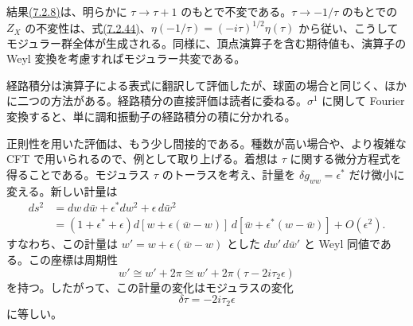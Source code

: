 結果\hyperref[eq:7.2.8]{(7.2.8)}は、明らかに $\tau\to\tau+1$ のもとで不変である。$\tau\to-1/\tau$ のもとでの $Z_X$ の不変性は、式\hyperref[eq:7.2.44b]{(7.2.44)}、$\eta(-1/\tau)=(-i\tau)^{1/2}\eta(\tau)$ から従い、こうしてモジュラー群全体が生成される。同様に、頂点演算子を含む期待値も、演算子の Weyl 変換を考慮すればモジュラー共変である。

経路積分は演算子による表式に翻訳して評価したが、球面の場合と同じく、ほかに二つの方法がある。経路積分の直接評価は読者に委ねる。$\sigma^1$ に関して Fourier 変換すると、単に調和振動子の経路積分の積に分かれる。

正則性を用いた評価は、もう少し間接的である。種数が高い場合や、より複雑な CFT で用いられるので、例として取り上げる。着想は $\tau$ に関する微分方程式を得ることである。モジュラス $\tau$ のトーラスを考え、計量を $\delta g_{ww}=\epsilon^*$ だけ微小に変える。新しい計量は
\begin{equation}
\begin{aligned}
ds^2&=dw\,d\bar w+\epsilon^*dw^2+\epsilon\,d\bar w^2\\
&=(1+\epsilon^*+\epsilon)
d[w+\epsilon(\bar w-w)]\,d[\bar w+\epsilon^*(w-\bar w)]
+O(\epsilon^2).
\end{aligned}
\tag{7.2.11}\label{eq:7.2.11}
\end{equation}
すなわち、この計量は $w'=w+\epsilon(\bar w-w)$ とした $dw'\,d\bar w'$ と Weyl 同値である。この座標は周期性
\begin{equation}
w'\cong w'+2\pi\cong w'+2\pi(\tau-2i\tau_2\epsilon)
\tag{7.2.12}\label{eq:7.2.12}
\end{equation}
を持つ。したがって、この計量の変化はモジュラスの変化
\begin{equation}
\delta\tau=-2i\tau_2\epsilon
\tag{7.2.13}\label{eq:7.2.13}
\end{equation}
に等しい。

